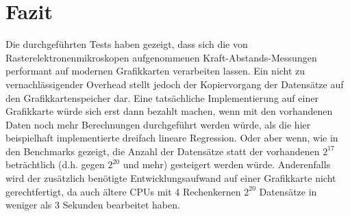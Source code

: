 %
%
%    
%
%
%    


\chapter{Fazit}
Die durchgeführten Tests haben gezeigt, dass sich die von Rasterelektronenmikroskopen aufgenommenen Kraft-Abstands-Messungen performant auf modernen Grafikkarten verarbeiten lassen.
Ein nicht zu vernachlässigender Overhead stellt jedoch der Kopiervorgang der Datensätze auf den Grafikkartenspeicher dar. Eine tatsächliche Implementierung auf einer Grafikkarte würde sich erst dann bezahlt machen, wenn mit den vorhandenen Daten noch mehr Berechnungen durchgeführt werden würde, als die hier beispielhaft implementierte dreifach lineare Regression. Oder aber wenn, wie in den Benchmarks gezeigt, die Anzahl der Datensätze statt der vorhandenen $2^{17}$ beträchtlich (d.h. gegen $2^{20}$ und mehr) gesteigert werden würde.
Anderenfalls wird der zusätzlich benötigte Entwicklungsaufwand auf einer Grafikkarte nicht gerechtfertigt, da auch ältere CPUs mit 4 Rechenkernen $2^{20}$ Datensätze in weniger als 3 Sekunden bearbeitet haben.